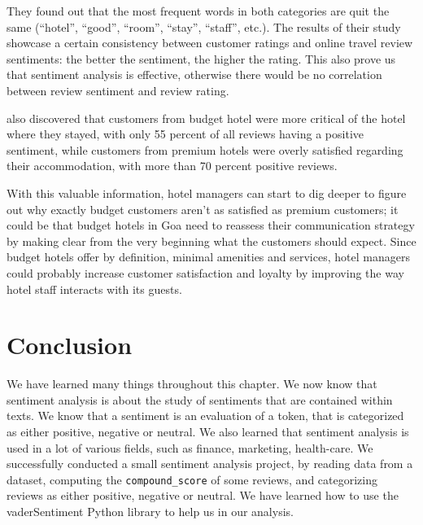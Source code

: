 	They found out that the most frequent words in both categories are quit the same (``hotel'', ``good'', ``room'', ``stay'', ``staff'', etc.). The results of their study showcase a certain consistency between customer ratings and online travel review sentiments: the better the sentiment, the higher the rating. This also prove us that sentiment analysis is effective, otherwise there would be no correlation between review sentiment and review rating.

	\cite{geetha_relationship_2017} also discovered that customers from budget hotel were more critical of the hotel where they stayed, with only 55 percent of all reviews having a positive sentiment, while customers from premium hotels were overly satisfied regarding their accommodation, with more than 70 percent positive reviews.

	With this valuable information, hotel managers can start to dig deeper to figure out why exactly budget customers aren't as satisfied as premium customers; it could be that budget hotels in Goa need to reassess their communication strategy by making clear from the very beginning what the customers should expect. Since budget hotels offer by definition, minimal amenities and services, hotel managers could probably increase customer satisfaction and loyalty by improving the way hotel staff interacts with its guests.

	\section{Conclusion}
	We have learned many things throughout this chapter. We now know that sentiment analysis is about the study of sentiments that are contained within texts. We know that a sentiment is an evaluation of a token, that is categorized as either positive, negative or neutral. We also learned that sentiment analysis is used in a lot of various fields, such as finance, marketing, health-care. We successfully conducted a small sentiment analysis project, by reading data from a dataset, computing the \verb|compound_score| of some reviews, and categorizing reviews as either positive, negative or neutral. We have learned how to use the vaderSentiment Python library to help us in our analysis.


